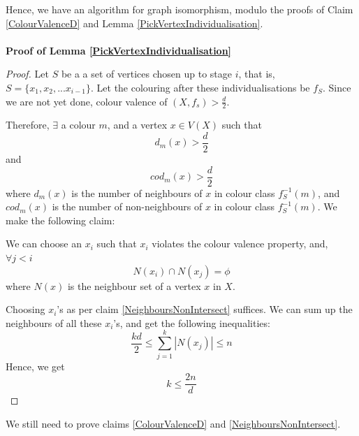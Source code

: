 Hence, we have an algorithm for graph isomorphism, modulo the proofs of Claim \ref{ColourValenceD} and Lemma \ref{PickVertexIndividualisation}.
\paragraph*{}
\textbf{Proof of Lemma \ref{PickVertexIndividualisation}}
\begin{proof}
Let $S$ be a a set of vertices chosen up to stage $i$, that is, $S = \lbrace x_1, x_2, ... x_{i-1} \rbrace$. Let the colouring after these individualisations be $f_S$.
Since we are not yet done, colour valence of $(X, f_s) > \frac{d}{2}$.

Therefore, $\exists$ a colour $m$, and a vertex $x \in V(X)$ such that
\[
d_m (x) > \frac{d}{2}
\]
and 
\[
cod_m (x) > \frac{d}{2}
\]
where $d_m(x)$ is the number of neighbours of $x$ in colour class $f_S^{-1}(m)$, and $cod_m(x)$ is the number of non-neighbours of $x$ in colour class $f_S^{-1}(m)$.
We make the following claim:
\begin{claim}\label{NeighboursNonIntersect}
We can choose an $x_i$ such that $x_i$ violates the colour valence property, and,  
$\forall j < i$
\[
N(x_i) \cap N(x_j) = \phi 
\]
where $N(x)$ is the neighbour set of a vertex $x$ in $X$.
\end{claim}
Choosing $x_i$'s as per claim \ref{NeighboursNonIntersect} suffices. We can sum up the neighbours of all these $x_i$'s, and get the following inequalities:
\[
\frac{kd}{2} \le \sum_{j=1}^k |N(x_j)| \le n
\] 
Hence, we get 
\[
k \le \frac{2n}{d}
\]
\end{proof}

We still need to prove claims \ref{ColourValenceD} and \ref{NeighboursNonIntersect}.
